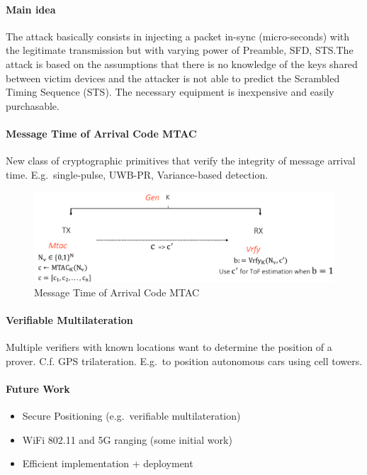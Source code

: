 \paragraph{Main idea}
The attack basically consists in injecting a packet in-sync (micro-seconds) with the legitimate transmission but with varying power of Preamble, SFD, STS.\@ The attack is based on the assumptions that there is no knowledge of the keys shared between victim devices and the attacker is not able to predict the Scrambled Timing Sequence (STS).
The necessary equipment is inexpensive and easily purchasable.

\paragraph{Message Time of Arrival Code MTAC}
New class of cryptographic primitives that verify the integrity of message arrival time.
E.g.\ single-pulse, UWB-PR, Variance-based detection.

\begin{figure}[h]
	\centering
	\includegraphics[scale=0.3]{images/5-mtac.png}
	\caption{Message Time of Arrival Code MTAC}%
	\label{fig:mtac}
\end{figure}

\paragraph{Verifiable Multilateration}
Multiple verifiers with known locations want to determine the position of a prover.
C.f. GPS trilateration.
E.g.\ to position autonomous cars using cell towers.


\paragraph{Future Work}
\begin{itemize}
	\item Secure Positioning (e.g.\ verifiable multilateration)
	\item WiFi 802.11 and 5G ranging (some initial work)
	\item Efficient implementation + deployment
\end{itemize}

